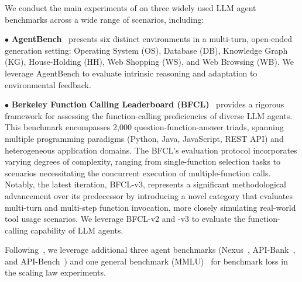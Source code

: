 We conduct the main experiments of \method on three widely used LLM agent benchmarks across a wide range of scenarios, including: 

\noindent $\bullet$ \textbf{AgentBench}~\cite{liu2024agentbench} presents six distinct environments in a multi-turn, open-ended generation setting: Operating System (OS), Database (DB), Knowledge Graph (KG), House-Holding (HH), Web Shopping (WS), and Web Browsing (WB). We leverage AgentBench to evaluate intrinsic reasoning and adaptation to environmental feedback.

\noindent $\bullet$ \textbf{Berkeley Function Calling Leaderboard (BFCL)}~\cite{patil2023gorilla} provides a rigorous framework for assessing the function-calling proficiencies of diverse LLM agents. This benchmark encompasses 2,000 question-function-answer triads, spanning multiple programming paradigms (Python, Java, JavaScript, REST API) and heterogeneous application domains. The BFCL's evaluation protocol incorporates varying degrees of complexity, ranging from single-function selection tasks to scenarios necessitating the concurrent execution of multiple-function calls. Notably, the latest iteration, BFCL-v3, represents a significant methodological advancement over its predecessor by introducing a novel category that evaluates multi-turn and multi-step function invocation, more closely simulating real-world tool usage scenarios. We leverage BFCL-v2 and -v3 to evaluate the function-calling capability of LLM agents. 

Following~\citet{dubey2024llama}, we leverage additional three agent benchmarks (Nexus~\cite{srinivasan2023nexusraven}, API-Bank~\cite{li2023api}, and API-Bench~\cite{patil2023gorilla}) and one general benchmark (MMLU)~\cite{hendrycks2020measuring} for benchmark loss in the scaling law experiments.